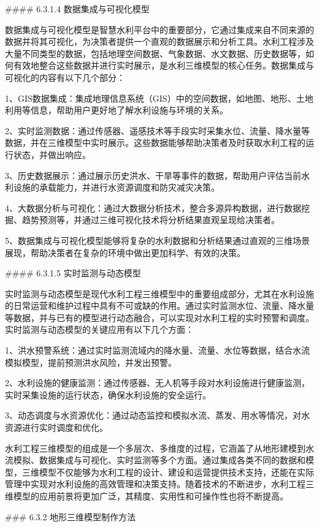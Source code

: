\#\#\#\# 6.3.1.4 数据集成与可视化模型

数据集成与可视化模型是智慧水利平台中的重要部分，它通过集成来自不同来源的数据并将其可视化，为决策者提供一个直观的数据展示和分析工具。水利工程涉及大量不同类型的数据，包括地理空间数据、气象数据、水文数据、历史数据等，如何有效地整合这些数据并进行实时展示，是水利三维模型的核心任务。数据集成与可视化的内容有以下几个部分：

1、GIS数据集成：集成地理信息系统（GIS）中的空间数据，如地图、地形、土地利用等信息，帮助用户更好地了解水利设施与环境的关系。

2、实时监测数据：通过传感器、遥感技术等手段实时采集水位、流量、降水量等数据，并在三维模型中实时展示。这些数据能够帮助决策者及时获取水利工程的运行状态，并做出响应。

3、历史数据展示：通过展示历史洪水、干旱等事件的数据，帮助用户评估当前水利设施的承载能力，并进行水资源调度和防灾减灾决策。

4、大数据分析与可视化：通过大数据分析技术，整合多源异构数据，进行数据挖掘、趋势预测等，并通过三维可视化技术将分析结果直观呈现给决策者。

5、数据集成与可视化模型能够将复杂的水利数据和分析结果通过直观的三维场景展现，帮助决策者在复杂的环境中做出更加科学、有效的决策。

\#\#\#\# 6.3.1.5 实时监测与动态模型

实时监测与动态模型是现代水利工程三维模型中的重要组成部分，尤其在水利设施的日常运营和维护过程中具有不可或缺的作用。通过实时监测水位、流量、降水量等数据，并与已有的模型进行动态融合，可以实现对水利工程的实时预警和调度。实时监测与动态模型的关键应用有以下几个方面：

1、洪水预警系统：通过实时监测流域内的降水量、流量、水位等数据，结合水流模拟模型，提前预测洪水风险，并发出预警。

2、水利设施的健康监测：通过传感器、无人机等手段对水利设施进行健康监测，实时采集设施的运行状态，确保水利设施的安全运行。

3、动态调度与水资源优化：通过动态监控和模拟水流、蒸发、用水等情况，对水资源进行实时调度和优化。

水利工程三维模型的组成是一个多层次、多维度的过程，它涵盖了从地形建模到水流模拟、数据集成与可视化、实时监测等多个方面。通过集成各类不同的数据和模型，三维模型不仅能够为水利工程的设计、建设和运营提供技术支持，还能在实际管理中实现对水利设施的高效管理和决策支持。随着技术的不断进步，水利工程三维模型的应用前景将更加广泛，其精度、实用性和可操作性也将不断提高。

\#\#\# 6.3.2 地形三维模型制作方法

